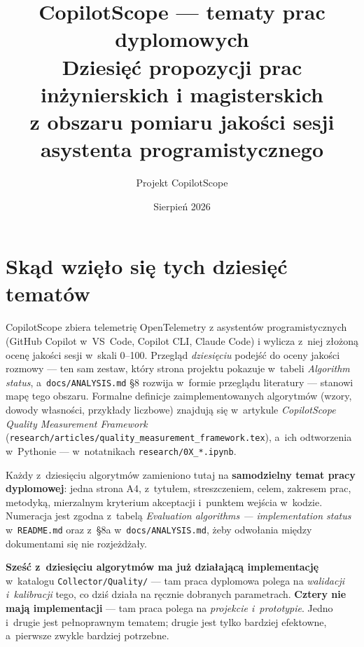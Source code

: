 \documentclass[11pt,a4paper]{article}
\title{%
  \textbf{CopilotScope --- tematy prac dyplomowych}\\[0.4em]
  \large Dziesięć propozycji prac inżynierskich i magisterskich\\
  z obszaru pomiaru jakości sesji asystenta programistycznego
}
\author{Projekt CopilotScope}
\date{Sierpień 2026}
\begin{document}
\maketitle
\thispagestyle{fancy}

\vspace{-1em}

\section*{Skąd wzięło się tych dziesięć tematów}

CopilotScope zbiera telemetrię OpenTelemetry z asystentów programistycznych
(GitHub Copilot w~VS~Code, Copilot CLI, Claude Code) i wylicza z~niej złożoną
ocenę jakości sesji w~skali 0--100. Przegląd \emph{dziesięciu} podejść do oceny
jakości rozmowy --- ten sam zestaw, który strona projektu pokazuje w~tabeli
\textit{Algorithm status}, a~\texttt{docs/ANALYSIS.md} §8 rozwija w~formie
przeglądu literatury --- stanowi mapę tego obszaru. Formalne definicje
zaimplementowanych algorytmów (wzory, dowody własności, przykłady liczbowe)
znajdują się w~artykule
\textit{CopilotScope Quality Measurement Framework}
(\texttt{research/articles/quality\_measurement\_framework.tex}), a~ich
odtworzenia w~Pythonie --- w~notatnikach \texttt{research/0X\_*.ipynb}.

Każdy z~dziesięciu algorytmów zamieniono tutaj na \textbf{samodzielny temat pracy
dyplomowej}: jedna strona A4, z~tytułem, streszczeniem, celem, zakresem prac,
metodyką, mierzalnym kryterium akceptacji i~punktem wejścia w~kodzie. Numeracja
jest zgodna z~tabelą \textit{Evaluation algorithms --- implementation status}
w~\texttt{README.md} oraz z~§8a w~\texttt{docs/ANALYSIS.md}, żeby odwołania
między dokumentami się nie rozjeżdżały.

\textbf{Sześć z~dziesięciu algorytmów ma już działającą implementację}
w~katalogu \texttt{Collector/Quality/} --- tam praca dyplomowa polega na
\emph{walidacji i~kalibracji} tego, co dziś działa na ręcznie dobranych
parametrach. \textbf{Cztery nie mają implementacji} --- tam praca polega na
\emph{projekcie i~prototypie}. Jedno i~drugie jest pełnoprawnym tematem; drugie
jest tylko bardziej efektowne, a~pierwsze zwykle bardziej potrzebne.
\end{document}
